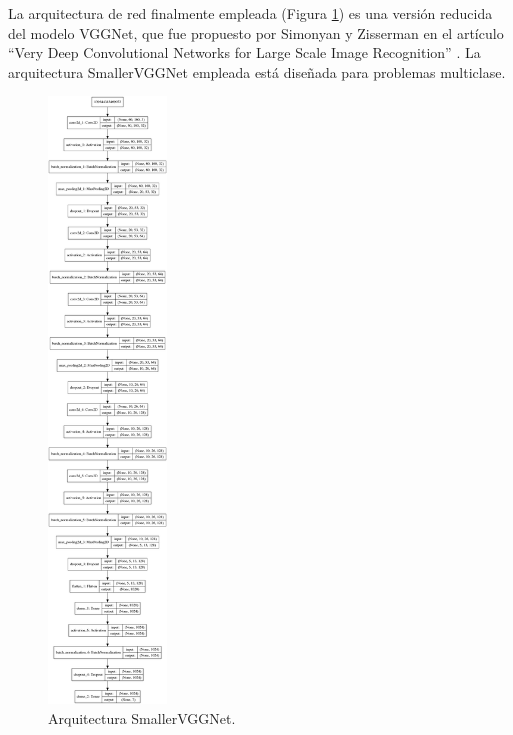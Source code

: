 La arquitectura de red finalmente empleada \cite{smallerVggNet} (Figura \ref{fig.SmallerVGGNet}) es una versión reducida del modelo VGGNet, que fue propuesto por Simonyan y Zisserman en el artículo ``Very Deep Convolutional Networks for Large Scale Image Recognition'' \cite{vgg}. La arquitectura SmallerVGGNet empleada está diseñada para problemas multiclase. \\

\begin{figure}
\begin{center}
	\includegraphics[width=0.28\textwidth]{figures/Clasificacion/model_smallervgg.png}
   \caption{Arquitectura SmallerVGGNet.}
	\label{fig.SmallerVGGNet}
\end{center}
\end{figure}


